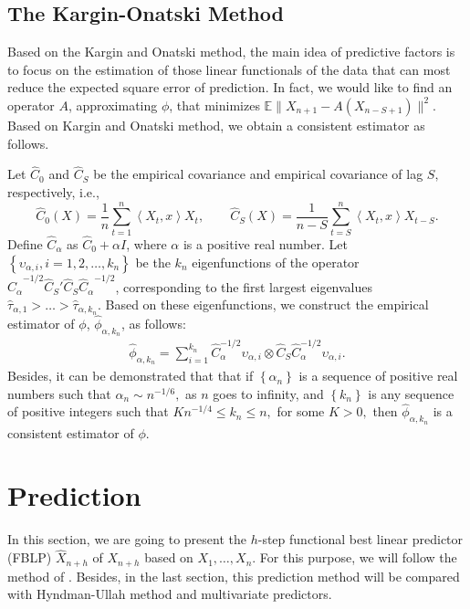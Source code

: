 \documentclass[11pt,a4paper]{article}
\numberwithin{equation}{section}
\newcommand{\E}{\mathbb{E}}
\begin{document}
\subsection{The Kargin-Onatski Method}

Based on the Kargin and Onatski method, the main idea of predictive factors is to focus on the estimation  of those linear functionals of the data that can most reduce the expected square error of prediction. In fact, we would like to find an operator $A$, approximating $\phi$, that minimizes $\E\|X_{n+1}-A(X_{n-S+1})\|^{2}$. Based on Kargin and Onatski method, we obtain a consistent estimator as follows.

Let $\hat{C}_0$ and $\hat{C}_S$ be the empirical covariance and empirical covariance of lag $S,$ respectively, i.e.,
\[
  \hat{C}_0(X)=\frac{1}{n}\sum_{t=1}^n \left\langle X_t,x\right\rangle X_t,
  \qquad
  \hat{C}_S(X)=\frac{1}{n-S}\sum_{t=S}^{n} \left\langle X_t,x\right\rangle X_{t-S}.
\]
Define $\hat{C}_\alpha$ as $\hat{C}_0+\alpha I$, where $\alpha$ is a positive real number.  Let $\left\{\upsilon_{\alpha,i},i=1,2,\dots, k_n\right\}$ be the $k_n$ eigenfunctions of the operator ${\hat{C}_{\alpha}}^{-1/2}\hat{C}_S' \hat{C}_S{\hat{C}_{\alpha}}^{-1/2}$, corresponding to the first largest eigenvalues $\hat{\tau}_{\alpha,1}>\dots>\hat{\tau}_{\alpha,k_n}.$ Based on these eigenfunctions, we construct the empirical estimator of $\phi$, $\hat{\phi}_{\alpha,k_n}$, as follows:
\begin{align}
  \hat{\phi}_{\alpha,k_n}=\sum_{i=1}^{k_n}\hat{C}_\alpha^{-1/2}\upsilon_{\alpha,i}\otimes  \hat{C}_S\hat{C}_\alpha^{-1/2}\upsilon_{\alpha,i}.
\end{align}
Besides, it can be demonstrated that that if $\left\{\alpha_n\right\}$ is  a sequence of positive real numbers such that $\alpha_n\sim n^{-1/6},$ as $n$ goes  to infinity, and $\left\{k_n\right\}$ is any sequence of positive integers such that $Kn^{-1/4}\leq k_n\leq n,$ for some $K > 0,$ then  $\hat{\phi}_{\alpha,k_n}$ is a consistent estimator of $\phi.$


\section{Prediction}\label{sec:prediction}

In this section, we are going to present the $h$-step functional best linear predictor (FBLP) $\hat{X}_{n+h}$  of $X_{n+h}$ based on $X_1,\dots,X_n$. For this purpose, we will follow the method of \citet{Bosq2014}.  Besides, in the last section, this prediction method will be compared with Hyndman-Ullah method and multivariate predictors.
\end{document}
